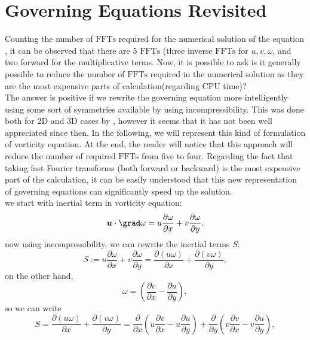 \documentclass[12pt]{article}
\def\u{\bm{u}}
\begin{document}
\section{Governing Equations Revisited}
Counting the number of $\text{FFTs}$ required for the numerical solution of the equation , it can be observed that there are 5 $\text{FFTs}$ (three inverse $\text{FFTs}$ for $u,v,\omega$, and two forward for the multiplicative terms. Now, it is possible to ask is it generally possible to reduce the number of $\text{FFTs}$ required in the numerical solution as they are the most expensive parts of calculation(regarding CPU time)?		\\
The answer is positive if we rewrite the governing equation more intelligently using some sort of symmetries available by using incompressibility. This was done both for 2D and 3D cases by
, however it seems that it has not been well appreciated since then. In the following, we will represent this kind of formulation of vorticity equation. At the end, the reader will notice that this approach will reduce the number of required $\text{FFTs}$ from five to four. Regarding the
fact that taking fast Fourier transforms (both forward or backward) is the most expensive part of the calculation, it can be easily understood that this new representation of governing equations can significantly speed up the solution. 	\\
we start with inertial term in vorticity equation:
\begin{equation}\label{Eq-15}
\u\cdot\grad\omega=u\dfrac{\partial \omega}{\partial x}+v\dfrac{\partial \omega}{\partial y}.
\end{equation}
now using incompressibility, we can rewrite the inertial terms $S$:
\begin{equation}\label{Eq-16}
S :=u\dfrac{\partial \omega}{\partial x}+v\dfrac{\partial \omega}{\partial y}=\dfrac{\partial (u\omega)}{\partial x}+\dfrac{\partial (v\omega)}{\partial y},
\end{equation}
on the other hand,
\begin{equation}\label{Eq-17}
\omega=\left(\dfrac{\partial v}{\partial x}-\dfrac{\partial u}{\partial y}\right),
\end{equation}
so we can write
\begin{equation}\label{Eq-18}
S =\dfrac{\partial (u\omega)}{\partial x}+\dfrac{\partial (v\omega)}{\partial y}=\dfrac{\partial}{\partial x} \left(u\dfrac{\partial v}{\partial x}-u\dfrac{\partial u}{\partial y}\right)+\dfrac{\partial}{\partial y} \left(v\dfrac{\partial v}{\partial x}-v\dfrac{\partial u}{\partial y}\right),
\end{equation}
\end{document}
